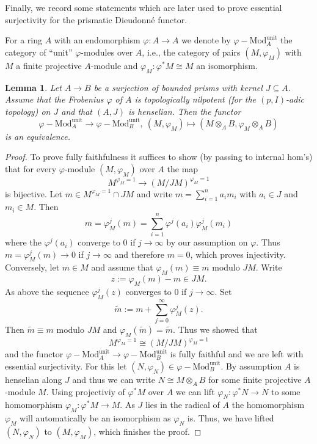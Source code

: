 \documentclass{amsart}
\theoremstyle{plain}
\newtheorem{lemma}[theorem]{Lemma}
\theoremstyle{definition}
\newcommand{\blue}[1]{{\color{black}#1}}
\begin{document}
Finally, we record some statements which are later used to prove essential surjectivity for the prismatic Dieudonn\'e functor.

For a ring $A$ with an endomorphism $\varphi\colon A\to A$ we denote by $\varphi-\mathrm{Mod}_A^{\mathrm{unit}}$ the category of ``unit'' $\varphi$-modules over $A$, i.e., the category of pairs $(M,\varphi_M)$ with $M$ a finite projective $A$-module and $\varphi_M\colon \varphi^\ast M\cong M$ an isomorphism.

\begin{lemma}
  \label{sec:essent-surj-lemma-equivalence-of-varphi-modules-over-delta-rings}
Let $A\to B$ be a surjection of \blue{bounded} prisms with kernel $J\subseteq A$. Assume that the Frobenius $\varphi$ of $A$ is topologically nilpotent \blue{(for the $(p,I)$-adic topology)} on $J$ and that $(A,J)$ is henselian. Then the functor
$$
\varphi-\mathrm{Mod}_A^{\mathrm{unit}}\to \varphi-\mathrm{Mod}_B^{\mathrm{unit}},\ (M,\varphi_M)\mapsto (M\otimes_A B,\varphi_M\otimes_A B)
$$ 
is an equivalence.
\end{lemma}
\begin{proof}
  To prove fully faithfulness it suffices to show (by passing to internal hom's) that for every $\varphi$-module $(M,\varphi_M)$ over $A$ the map
$$
M^{\varphi_M=1}\to (M/JM)^{\varphi_M=1}
$$
is bijective. Let $m\in M^{\varphi_M=1}\cap JM$ and write $m=\sum\limits_{i=1}^na_im_i$ with $a_i\in J$ and $m_i\in M$. Then
$$
m=\varphi^j_M(m)=\sum\limits_{i=1}^n\varphi^j(a_i)\varphi_M^j(m_i)
$$
where the $\varphi^j(a_i)$ converge to $0$ if $j\to \infty$ by our assumption on $\varphi$. Thus $m=\varphi^j_M(m)\to 0$ if $j\to \infty$ and therefore $m=0$, which proves injectivity.
Conversely, let $m\in M$ and assume that $\varphi_M(m)\equiv m$ modulo $JM$. Write
$$
z:=\varphi_M(m)-m\in JM.
$$
As above the sequence $\varphi_M^j(z)$ converges to $0$ if $j\to \infty$. Set
$$
\tilde{m}:=m+\sum\limits_{j=0}^\infty \varphi_M^j(z).
$$
Then $\tilde{m}\equiv m$ modulo $JM$ and $\varphi_M(\tilde{m})=\tilde{m}$.
Thus we showed that
$$
M^{\varphi_M=1}\cong (M/JM)^{\varphi_M=1}
$$
and the functor $\varphi-\mathrm{Mod}_A^{\mathrm{unit}}\to \varphi-\mathrm{Mod}_B^{\mathrm{unit}}$ is fully faithful and we are left with essential surjectivity.
For this let $(N,\varphi_N)\in \varphi-\mathrm{Mod}_B^{\mathrm{unit}}$. By assumption $A$ is henselian along $J$ and thus we can write $N\cong M\otimes_A B$ for some finite projective $A$-module $M$. Using projectiviy of $\varphi^\ast M$ over $A$ we can lift $\varphi_N\colon \varphi^\ast N\to N$ to some homomorphism $\varphi_M\colon \varphi^\ast M\to M$. As $J$ lies in the radical of $A$ the homomorphism $\varphi_M$ will automatically be an isomorphism as $\varphi_N$ is. Thus, we have lifted $(N,\varphi_N)$ to $(M,\varphi_M)$, which finishes the proof.
\end{proof}
\end{document}
